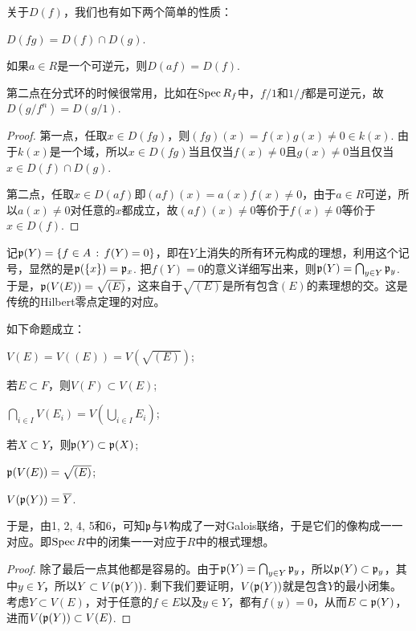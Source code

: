 \begin{pro}
关于$D(f)$，我们也有如下两个简单的性质：
\begin{compactenum}[~~~1.]
\item $D(fg)=D(f)\cap D(g)$.
\item 如果$a\in R$是一个可逆元，则$D(af)=D(f)$.
\end{compactenum}
\end{pro}

第二点在分式环的时候很常用，比如在$\operatorname{Spec} R_f$中，$f/1$和$1/f$都是可逆元，故$D(g/f^n)=D(g/1)$.

\begin{proof}
第一点，任取$x\in D(fg)$，则$(fg)(x)=f(x)g(x)\neq 0\in k(x)$. 由于$k(x)$是一个域，所以$x\in D(fg)$当且仅当$f(x)\neq 0$且$g(x)\neq 0$当且仅当$x\in D(f)\cap D(g)$.

第二点，任取$x\in D(af)$即$(af)(x)=a(x)f(x)\neq 0$，由于$a\in R$可逆，所以$a(x)\neq 0$对任意的$x$都成立，故$(af)(x)\neq 0$等价于$f(x)\neq 0$等价于$x\in D(f)$.
\end{proof}

记$\mathfrak{p}(Y)=\{f\in A\,:\, f(Y)=0\}$，即在$Y$上消失的所有环元构成的理想，利用这个记号，显然的是$\mathfrak{p}(\{x\})=\mathfrak{p}_x$. 把$f(Y)=0$的意义详细写出来，则$\mathfrak{p}(Y)=\bigcap_{y\in Y}\mathfrak{p}_y$. 于是，$\mathfrak{p}(V(E))=\sqrt{(E)}$，这来自于$\sqrt{(E)}$是所有包含$(E)$的素理想的交。这是传统的Hilbert零点定理的对应。

\begin{pro}如下命题成立：
\begin{compactenum}[~~~1.]
\item $V(E)=V((E))=V(\sqrt{(E)})$;
\item 若$E\subset F$，则$V(F)\subset V(E)$;
\item $\bigcap_{i\in I}V(E_i)=V(\bigcup_{i\in I}E_i)$;
\item 若$X\subset Y$，则$\mathfrak{p}(Y) \subset \mathfrak{p}(X)$;
\item $\mathfrak{p}(V(E))=\sqrt{(E)}$;
\item $V(\mathfrak{p}(Y))=\overline{Y}$.
\end{compactenum}
\end{pro}

于是，由1, 2, 4, 5和6，可知$\mathfrak{p}$与$V$构成了一对Galois联络，于是它们的像构成一一对应。即$\operatorname{Spec} R$中的闭集一一对应于$R$中的根式理想。

\begin{proof}

除了最后一点其他都是容易的。由于$\mathfrak{p}(Y)=\bigcap_{y\in Y}\mathfrak{p}_y$，所以$\mathfrak{p}(Y) \subset \mathfrak{p}_y$，其中$y\in Y$，所以$Y\subset V(\mathfrak{p}(Y))$. 剩下我们要证明，$V(\mathfrak{p}(Y))$就是包含$Y$的最小闭集。考虑$Y\subset V(E)$，对于任意的$f\in E$以及$y\in Y$，都有$f(y)=0$，从而$E\subset \mathfrak{p}(Y)$，进而$V(\mathfrak{p}(Y))\subset V(E)$. 
\end{proof}

